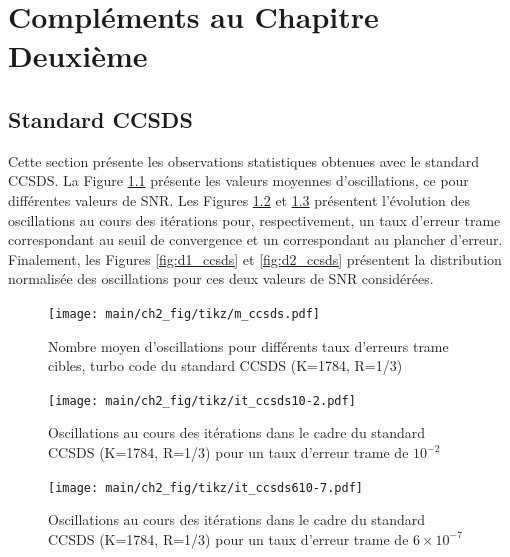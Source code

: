 

\chapter{Compléments au Chapitre Deuxième}
\section{Standard CCSDS}\label{sec:annCCSDS}
Cette section présente les observations statistiques obtenues avec le standard CCSDS. La Figure \ref{fig:m_ccsds} présente 
les valeurs moyennes d'oscillations, ce pour différentes valeurs de SNR. Les Figures \ref{fig:it1_ccsds} et \ref{fig:it2_ccsds}
présentent l'évolution des oscillations au cours des itérations pour, respectivement, un taux d'erreur trame correspondant 
au seuil de convergence et un correspondant au plancher d'erreur. Finalement, les Figures \ref{fig:d1_ccsds} et \ref{fig:d2_ccsds} 
présentent la distribution normalisée des oscillations pour ces deux valeurs de SNR considérées.
\begin{figure}[tb]
	\begin{center}
	\texttt{[image: main/ch2\_fig/tikz/m\_ccsds.pdf]}
	\caption{Nombre moyen d'oscillations pour différents taux d'erreurs trame cibles, turbo code du standard CCSDS (K=1784, R=1/3) \label{fig:m_ccsds}}
	\end{center}
\end{figure}

\begin{figure}[!ht]
	\begin{center}
	\texttt{[image: main/ch2\_fig/tikz/it\_ccsds10-2.pdf]}
	\caption{Oscillations au cours des itérations dans le cadre du standard CCSDS (K=1784, R=1/3) pour un taux d'erreur trame de $10^{-2}$\label{fig:it1_ccsds}}
	\end{center}
\end{figure}

\begin{figure}[!ht]
	\begin{center}
	\texttt{[image: main/ch2\_fig/tikz/it\_ccsds610-7.pdf]}
	\caption{Oscillations au cours des itérations dans le cadre du standard CCSDS (K=1784, R=1/3) pour un taux d'erreur trame de $6\times10^{-7}$\label{fig:it2_ccsds}}
	\end{center}
\end{figure}

